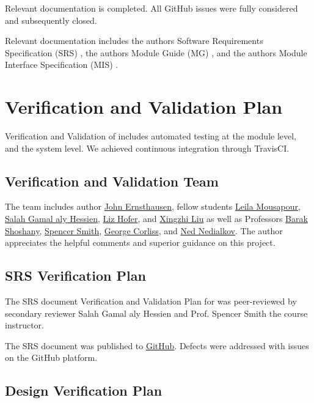 \documentclass[12pt, titlepage]{article}
\begin{document}
Relevant documentation is completed. All GitHub issues were fully considered and subsequently closed.

Relevant documentation includes the authors Software Requirements Specification (SRS) \citep{SRS}, the
authors Module Guide (MG) \citep{MG}, and the authors Module Interface Specification (MIS) \citep{MIS}.

\section{Verification and Validation Plan}

Verification and Validation of  includes automated testing at the module level,
and the system level. We achieved continuous integration through TravisCI.

\subsection{Verification and Validation Team}

The  team includes
author
\href{https://github.com/JohnErnsthausen}{John Ernsthausen},
fellow students
\href{https://github.com/LeilaMousapour}{Leila Mousapour},
\href{https://github.com/salahhessien}{Salah Gamal aly Hessien},
\href{https://github.com/liziscool}{Liz Hofer},
and
\href{https://github.com/XingzhiMac}{Xingzhi Liu} as well as Professors
\href{http://baraksh.com}{Barak Shoshany},
\href{https://github.com/smiths}{Spencer Smith},
\href{https://www.cs.mu.edu/~george/}{George Corliss},
and
\href{http://www.cas.mcmaster.ca/~nedialk}{Ned Nedialkov}.
The author appreciates the helpful comments and superior guidance on this project.

\subsection{SRS Verification Plan}

The SRS document Verification and Validation Plan for  was peer-reviewed by
secondary reviewer Salah Gamal aly Hessien and Prof. Spencer Smith the course instructor.

The SRS document was published to \href{https://github.com/JohnErnsthausen/roc}{GitHub}.
Defects were addressed with issues on the GitHub platform.

\subsection{Design Verification Plan}
\end{document}
